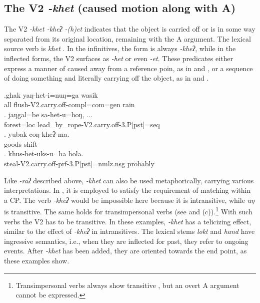 \subsection{The V2 \emph{-khet} (caused motion along with A)}\label{V2-carryoff}%

The V2 \emph{-khet \ti -kheʔ \ti -(h)et} indicates that the  object is carried off or is in some way separated from its original location, remaining with the A argument. The lexical source verb is \emph{khet} . In the infinitives, the form is always \emph{-kheʔ}, while in the inflected forms, the V2 surfaces as \emph{-het} or even \emph{-et}.  These predicates either express a manner of caused  away from a reference poin, as in \Next[a] and \Next[b], or a sequence of doing something and literally carrying off the object, as in  \Next[c] and \Next[d].


\exg.ghak yaŋ-het-i=nuŋ=ga  wasik\\
all flush{\sc -V2.carry.off-compl=com=gen} rain\\
 
\bg. jaŋgal=be sa-het-u=hoŋ, ...\\
forest{\sc =loc} lead\_by\_rope{\sc -V2.carry.off-3.P[pst]=seq}\\
 
\bg. yubak coŋ-kheʔ-ma.\\
goods shift\\
\bg. khus-het-uks-u=ha hola.\\
steal{\sc -V2.carry.off-prf-3.P[pst]=nmlz.nsg} probably\\
 

Like \emph{-raʔ}  described above, \emph{-khet}  can also be used  metaphorically, carrying various interpretations. In  \Next[a], it is employed to satisfy the requirement of matching  within a CP. The verb \emph{-kheʔ}  would be impossible here  because it is intransitive, while \emph{uŋ}  is transitive. The same holds for transimpersonal verbs (see \Next[b] and (c)).\footnote{Transimpersonal verbs always show  transitive , but an overt A argument cannot be expressed.} With such verbs the V2 has to be transitive. In these examples, \emph{-khet} has a  telicizing effect, similar to the effect of \emph{-kheʔ}  in intransitives. The lexical stems \emph{lokt} and \emph{hand}  have ingressive semantics, i.e., when they are inflected for past, they refer to ongoing events. After \emph{-khet} has been added, they are oriented towards the end point, as these examples show.

